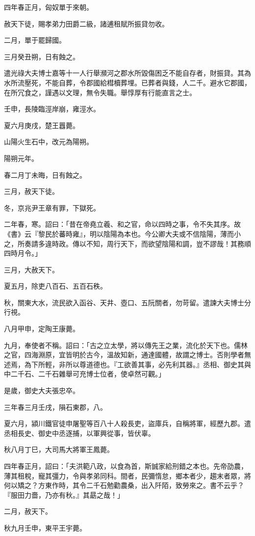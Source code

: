 \begin{pinyinscope}
四年春正月，匈奴單于來朝。

赦天下徒，賜孝弟力田爵二級，諸逋租賦所振貸勿收。

二月，單于罷歸國。

三月癸丑朔，日有蝕之。

遣光祿大夫博士嘉等十一人行舉瀕河之郡水所毀傷困乏不能自存者，財振貸。其為水所流壓死，不能自葬，令郡國給槥櫝葬埋。已葬者與錢，人二千。避水它郡國，在所冗食之，謹遇以文理，無令失職。舉惇厚有行能直言之士。

壬申，長陵臨涇岸崩，雍涇水。

夏六月庚戌，楚王囂薨。

山陽火生石中，改元為陽朔。

陽朔元年。

春二月丁未晦，日有蝕之。

三月，赦天下徒。

冬，京兆尹王章有罪，下獄死。

二年春，寒。詔曰：「昔在帝堯立羲、和之官，命以四時之事，令不失其序。故《書》云『黎民於蕃時雍』，明以陰陽為本也。今公卿大夫或不信陰陽，薄而小之，所奏請多違時政。傳以不知，周行天下，而欲望陰陽和調，豈不謬哉！其務順四時月令。」

三月，大赦天下。

夏五月，除吏八百石、五百石秩。

秋，關東大水，流民欲入函谷、天井、壺口、五阮關者，勿苛留。遣諫大夫博士分行視。

八月甲申，定陶王康薨。

九月，奉使者不稱。詔曰：「古之立太學，將以傳先王之業，流化於天下也。儒林之官，四海淵原，宜皆明於古今，溫故知新，通達國體，故謂之博士。否則學者無述焉，為下所輕，非所以尊道德也。『工欲善其事，必先利其器。』丞相、御史其與中二千石、二千石雜舉可充博士位者，使卓然可觀。」

是歲，御史大夫張忠卒。

三年春三月壬戌，隕石東郡，八。

夏六月，潁川鐵官徒申屠聖等百八十人殺長吏，盜庫兵，自稱將軍，經歷九郡。遣丞相長史、御史中丞逐捕，以軍興從事，皆伏辜。

秋八月丁巳，大司馬大將軍王鳳薨。

四年春正月，詔曰：「夫洪範八政，以食為首，斯誠家給刑錯之本也。先帝劭農，薄其租稅，寵其彊力，令與孝弟同科。間者，民彌惰怠，鄉本者少，趨末者眾，將何以矯之？方東作時，其令二千石勉勸農桑，出入阡陌，致勞來之。書不云乎？『服田力嗇，乃亦有秋。』其勗之哉！」

二月，赦天下。

秋九月壬申，東平王宇薨。


\end{pinyinscope}
